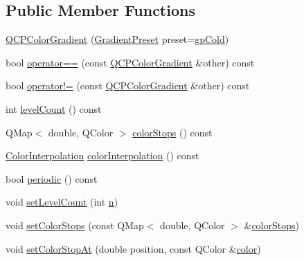 \subsection*{Public Member Functions}
\begin{DoxyCompactItemize}
\item 
\hyperlink{class_q_c_p_color_gradient_a546e44df5fa1846400a582c041361c85}{Q\+C\+P\+Color\+Gradient} (\hyperlink{class_q_c_p_color_gradient_aed6569828fee337023670272910c9072}{Gradient\+Preset} preset=\hyperlink{class_q_c_p_color_gradient_aed6569828fee337023670272910c9072aec8c001f62c0d5cb853db5fd85309557}{gp\+Cold})
\item 
bool \hyperlink{class_q_c_p_color_gradient_aada47d8206bf2cec77462653bf471c13}{operator==} (const \hyperlink{class_q_c_p_color_gradient}{Q\+C\+P\+Color\+Gradient} \&other) const 
\item 
bool \hyperlink{class_q_c_p_color_gradient_ac641f5d2dc1686201d3cb602c871791d}{operator!=} (const \hyperlink{class_q_c_p_color_gradient}{Q\+C\+P\+Color\+Gradient} \&other) const 
\item 
int \hyperlink{class_q_c_p_color_gradient_ae7537a8e6d0fed3f1928328062bb0f4e}{level\+Count} () const 
\item 
Q\+Map$<$ double, Q\+Color $>$ \hyperlink{class_q_c_p_color_gradient_a64f8aba7826f9c6363aacff8376cef37}{color\+Stops} () const 
\item 
\hyperlink{class_q_c_p_color_gradient_ac5dca17cc24336e6ca176610e7f77fc1}{Color\+Interpolation} \hyperlink{class_q_c_p_color_gradient_a731616fabe6f2e33f71f58dd382359d8}{color\+Interpolation} () const 
\item 
bool \hyperlink{class_q_c_p_color_gradient_a860b7048f877195d2a0fb8d5a7cf5d73}{periodic} () const 
\item 
void \hyperlink{class_q_c_p_color_gradient_a18da587eb4f7fc788ea28ba15b6a12de}{set\+Level\+Count} (int \hyperlink{_v_s_a___u_t_2_comparision_pictures_2_createtest_image_8m_aeab71244afb687f16d8c4f5ee9d6ef0e}{n})
\item 
void \hyperlink{class_q_c_p_color_gradient_a724e828aa6f0ba5011a9392477c35d3a}{set\+Color\+Stops} (const Q\+Map$<$ double, Q\+Color $>$ \&\hyperlink{class_q_c_p_color_gradient_a64f8aba7826f9c6363aacff8376cef37}{color\+Stops})
\item 
void \hyperlink{class_q_c_p_color_gradient_a3b48be5e78079db1bb2a1188a4c3390e}{set\+Color\+Stop\+At} (double position, const Q\+Color \&\hyperlink{class_q_c_p_color_gradient_a0599545c859268b025d2060dea741cea}{color})
\item 

\end{DoxyCompactItemize}
